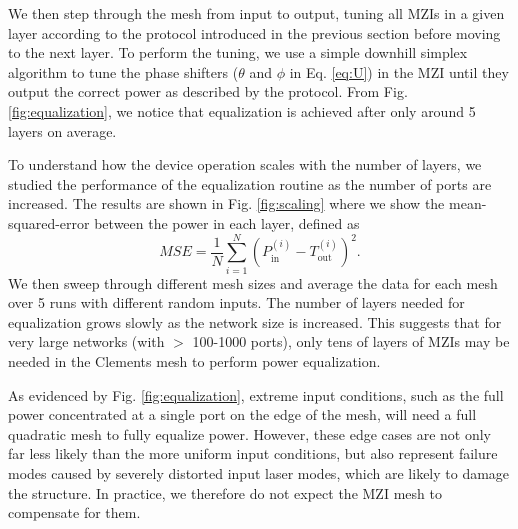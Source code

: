 We then step through the mesh from input to output, tuning all MZIs in a given layer according to the protocol introduced in the previous section before moving to the next layer.  To perform the tuning, we use a simple downhill simplex algorithm \cite{avriel_nonlinear_2003} to tune the phase shifters ($\theta$ and $\phi$ in Eq. \ref{eq:U}) in the MZI until they output the correct power as described by the protocol.  From Fig. \ref{fig:equalization}, we notice that equalization is achieved after only around 5 layers on average.

To understand how the device operation scales with the number of layers, we studied the performance of the equalization routine as the number of ports are increased.  The results are shown in Fig. \ref{fig:scaling} where we show the mean-squared-error between the power in each layer, defined as 
\begin{equation}
    MSE = \frac{1}{N}\sum_{i=1}^N \left( P_\textrm{in}^{(i)} - T_\textrm{out}^{(i)} \right)^2.
\end{equation}
We then sweep through different mesh sizes and average the data for each mesh over 5 runs with different random inputs.  The number of layers needed for equalization grows slowly as the network size is increased.  This suggests that for very large networks (with $>$ 100-1000 ports), only tens of layers of MZIs may be needed in the Clements mesh to perform power equalization.

As evidenced by Fig. \ref{fig:equalization}, extreme input conditions, such as the full power concentrated at a single port on the edge of the mesh, will need a full quadratic mesh to fully equalize power.  However, these edge cases are not only far less likely than the more uniform input conditions, but also represent failure modes caused by severely distorted input laser modes, which are likely to damage the structure.  In practice, we therefore do not expect the MZI mesh to compensate for them.

